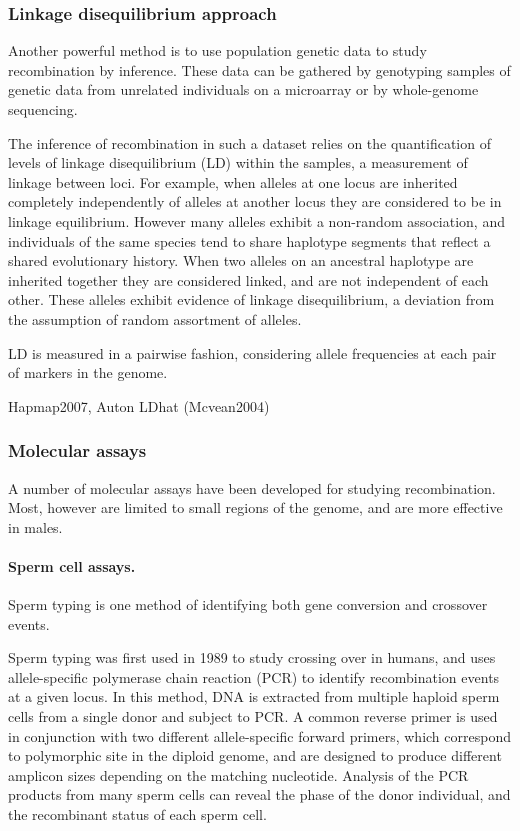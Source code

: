 
\subsubsection{Linkage disequilibrium approach}

Another powerful method is to use population genetic data to study recombination by inference.
These data can be gathered by genotyping samples of genetic data from unrelated individuals on a microarray or by whole-genome sequencing.

The inference of recombination in such a dataset relies on the quantification of levels of linkage disequilibrium (LD) within the samples, a measurement of linkage between loci.
For example, when alleles at one locus are inherited completely independently of alleles at another locus they are considered to be in linkage equilibrium.
However many alleles exhibit a non-random association, and individuals of the same species tend to share haplotype segments that reflect a shared evolutionary history.
When two alleles on an ancestral haplotype are inherited together they are considered linked, and are not independent of each other.
These alleles exhibit evidence of linkage disequilibrium, a deviation from the assumption of random assortment of alleles.

LD is measured in a pairwise fashion, considering allele frequencies at each pair of markers in the genome.


Hapmap2007, Auton LDhat (Mcvean2004)


\subsubsection{Molecular assays}

A number of molecular assays have been developed for studying recombination.
Most, however are limited to small regions of the genome, and are more effective in males.

\paragraph{Sperm cell assays.}

Sperm typing is one method of identifying both gene conversion and crossover events.

Sperm typing was first used in 1989 to study crossing over in humans\cite{Cui1989}, and uses
allele-specific polymerase chain reaction (PCR) to identify recombination events at a given locus.
In this method, DNA is extracted from multiple haploid sperm cells from a single donor and subject to PCR.
A common reverse primer is used in conjunction with two different allele-specific forward primers, which correspond to polymorphic site in the diploid genome, and are designed to produce different amplicon sizes depending on the matching nucleotide.
Analysis of the PCR products from many sperm cells can reveal the phase of the donor individual, and the recombinant status of each sperm cell.

